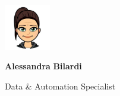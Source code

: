 \documentclass[8pt]{stackoverflow-upgraded-version} %
\begin{document}

\begin{minipage}[t]{0.13\textwidth} %
	\vspace{-\baselineskip} %
	\hfill
	\includegraphics[width=2cm, height=2cm]{my-profile.jpeg}
	\\
\end{minipage}
\begin{minipage}[t]{0.4\textwidth} %
	\vspace{-\baselineskip} %
	\begin{center}
		{\Huge\textcolor{stackoverflow-name}{\textbf{Alessandra}}} %
		{\Huge\textcolor{stackoverflow-name}{\textbf{Bilardi}}} %
		
		\vspace{6pt}
		
		{\Large Data \& Automation Specialist} %
	\end{center}
\end{minipage}
\begin{minipage}[t]{0.255\textwidth} %
	\vspace{-\baselineskip} %
	
	\\
	\\
	\\	
\end{minipage}
\end{document}
